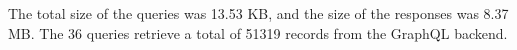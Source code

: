 \noindent The total size of the queries was 13.53 KB, and the size of the responses was 8.37 MB. The 36 queries retrieve a total of 51319 records from the GraphQL backend.






